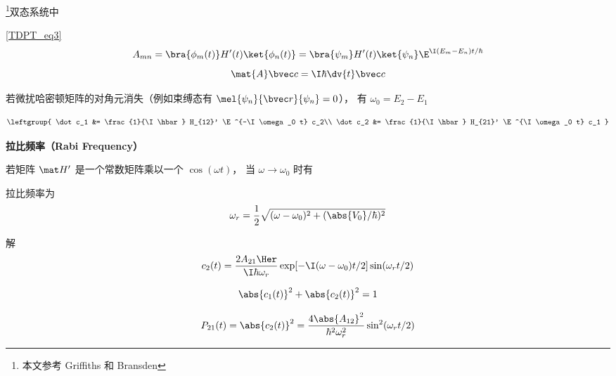 
\begin{issues}
\issueDraft
\end{issues}

\footnote{本文参考 Griffiths 和 Bransden}双态系统中

\autoref{TDPT_eq3}~
\begin{equation}
A_{mn} = \bra{\phi_m(t)} H'(t) \ket{\phi_n(t)} = \bra{\psi_m} H'(t) \ket{\psi_n} \E^{\I(E_m-E_n)t/\hbar}
\end{equation}
\begin{equation}
\mat {A} \bvec c = \I\hbar \dv{t} \bvec c
\end{equation}

若微扰哈密顿矩阵的对角元消失（例如束缚态有 $\mel{\psi_n}{\bvec r}{\psi_n} = 0$）， 有 $\omega_0 = E_2 - E_1$


\begin{equation}
\leftgroup{
\dot c_1 &= \frac{1}{\I \hbar} H_{12}' \E^{-\I\omega_0 t} c_2\\
\dot c_2 &= \frac{1}{\I \hbar} H_{21}' \E^{\I\omega_0 t} c_1
}\end{equation}

\textbf{拉比频率（Rabi Frequency）}

若矩阵 $\mat H'$ 是一个常数矩阵乘以一个 $\cos(\omega t)$， 当 $\omega \to \omega_0$ 时有


拉比频率为
\begin{equation}
\omega_r = \frac{1}{2} \sqrt{(\omega - \omega_0)^2 + (\abs{V_0}/\hbar)^2}
\end{equation}

解
\begin{equation}
c_2(t) = \frac{2A_{21}\Her}{\I \hbar \omega_r} \exp[-\I (\omega - \omega_0) t / 2] \sin(\omega_r t/2)
\end{equation}


\begin{equation}
\abs{c_1(t)}^2 + \abs{c_2(t)}^2 = 1
\end{equation}

\begin{equation}
P_{21}(t) = \abs{c_2(t)}^2 = \frac{4\abs{A_{12}}^2}{\hbar^2 \omega_r^2} \sin^2(\omega_r t/2)
\end{equation}

